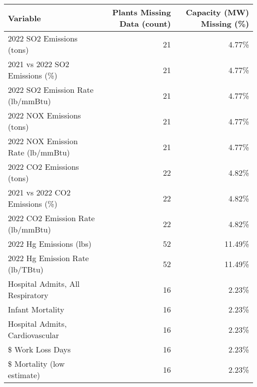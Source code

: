 \begin{table}[H]
    \centering
    \small
    \begin{adjustbox}{width=\textwidth}
      \begin{tabular}{|l | r | r |}
        \toprule
        \textbf{Variable} &  \textbf{Plants Missing Data (count)} &  \textbf{Capacity (MW) Missing (\%)} \\
        \midrule\midrule
        2022 SO2 Emissions (tons)                          &              21 &            4.77\% \\ \midrule
        2021 vs 2022 SO2 Emissions (\%)                     &              21 &            4.77\% \\ \midrule
        2022 SO2 Emission Rate (lb/mmBtu)                  &              21 &            4.77\% \\ \midrule
        2022 NOX Emissions (tons)                          &              21 &            4.77\% \\ \midrule
        2022 NOX Emission Rate (lb/mmBtu)                  &              21 &            4.77\% \\ \midrule
        2022 CO2 Emissions (tons)                          &              22 &            4.82\% \\ \midrule
        2021 vs 2022 CO2 Emissions (\%)                     &              22 &            4.82\% \\ \midrule
        2022 CO2 Emission Rate (lb/mmBtu)                  &              22 &            4.82\% \\ \midrule
        2022 Hg Emissions (lbs)                            &              52 &            11.49\% \\ \midrule
        2022 Hg Emission Rate (lb/TBtu)                    &              52 &            11.49\% \\ \midrule
        Hospital Admits, All Respiratory                   &              16 &            2.23\% \\ \midrule
        Infant Mortality                                   &              16 &            2.23\% \\ \midrule
        Hospital Admits, Cardiovascular                     &              16 &            2.23\% \\ \midrule
        \$ Work Loss Days                                   &              16 &            2.23\% \\ \midrule
        \$ Mortality (low estimate)                         &              16 &            2.23\% \\ \midrule

\end{tabular}
\end{adjustbox}
\end{table}
